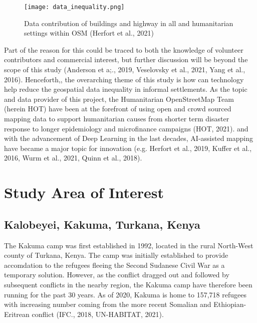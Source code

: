 \documentclass[11pt, a4paper, twoside]{report}
\begin{document}
\begin{figure}[H]
  \centering
  \texttt{[image: data\_inequality.png]}
  \caption{Data contribution of buildings and highway in all and humanitarian settings within OSM (Herfort et al., 2021)}
  \label{fig:data_inequality}
\end{figure}

Part of the reason for this could be traced to both the knowledge of volunteer contributors and commercial interest, but further discussion will be beyond the scope of this study (Anderson et a;., 2019, Veselovsky et al., 2021, Yang et al., 2016). Henceforth,, the overarching theme of this study is how can technology help reduce the geospatial data inequality in informal settlements. As the topic and data provider of this project, the Humanitarian OpenStreetMap Team (herein HOT) have been at the forefront of using open and crowd sourced mapping data to support humanitarian causes from shorter term disaster response to longer epidemiology and microfinance campaigns (HOT, 2021).  and with the advancement of Deep Learning in the last decades, AI-assisted mapping have became a major topic for innovation (e.g. Herfort et al., 2019, Kuffer et al., 2016, Wurm et al., 2021, Quinn et al., 2018).\\\par

\section{Study Area of Interest}\label{StudyAOI}
\subsection{Kalobeyei, Kakuma, Turkana, Kenya}\label{Kalobeyei}

The Kakuma camp was first established in 1992, located in the rural North-West county of Turkana, Kenya. The camp was initially established to provide accomdation to the refugees fleeing the Second Sudanese Civil War as a temporary solution. However, as the conflict dragged out and followed by subsequent conflicts in the nearby region, the Kakuma camp have therefore been running for the past 30 years. As of 2020, Kakuma is home to 157,718 refugees with increasing number coming from the more recent Somalian and Ethiopian-Eritrean conflict (IFC., 2018, UN-HABITAT, 2021).\\\par
\end{document}
